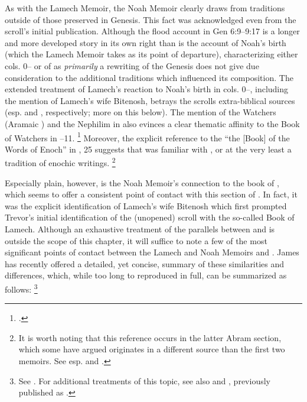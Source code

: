 As with the Lamech Memoir, the Noah Memoir clearly draws from traditions outside of those preserved in Genesis. This fact was acknowledged even from the scroll's initial publication.%
    \autocite[38]{avigad-yadin1956}
Although the flood account in Gen 6:9--9:17 is a longer and more developed story in its own right than is the account of Noah's birth (which the Lamech Memoir takes as its point of departure), characterizing either cols. 0-- or  of \ga as \emph{primarily} a rewriting of the Genesis does not give due consideration to the additional traditions which influenced its composition. The extended treatment of Lamech's reaction to Noah's birth in cols. 0--, including the mention of Lamech's wife Bitenosh, betrays the scrolls extra-biblical sources (esp. \firstenoch and \jub, respectively; more on this below). The mention of the Watchers (Aramaic ) and the Nephilim in  also evinces a clear thematic affinity to the Book of Watchers in --11.%
    \footnote{\Cite[174]{nickelsburg2005}.}
Moreover, the explicit reference to the ``the [Book] of the Words of Enoch'' in , 25 suggests that \ga was familiar with \firstenoch, or at the very least a tradition of enochic writings.%
    \footnote{It is worth noting that this reference occurs in the latter Abram section, which some have argued originates in a different source than the first two memoirs. See esp. \cite{bernstein_berthelot-etal2010} and \cite{bernstein_as2010}.}

Especially plain, however, is the Noah Memoir's connection to the book of \jub, which seems to offer a consistent point of contact with this section of \ga.%
    \autocite[20]{fitzmyer2004}
In fact, it was the explicit identification of Lamech's wife Bitenosh which first prompted Trevor's initial identification of the (unopened) scroll with the so-called Book of Lamech.%
    \autocite{trevor_basor1949}
Although an exhaustive treatment of the parallels between \jub and \ga is outside the scope of this chapter, it will suffice to note a few of the most significant points of contact between the Lamech and Noah Memoirs and \jub. James \vanderkam has recently offered a detailed, yet concise, summary of these similarities and differences, which, while too long to reproduced in full, can be summarized as follows:%
    \footnote{See \cite[374--376]{vanderkam_feldman-etal2017}. For additional treatments of this topic, see also 
    \cite{machiela2009} and 
    \cite[305--342]{kugel2012}, previously published as 
    \cite{kugel_roitman-etal2011}.} 

